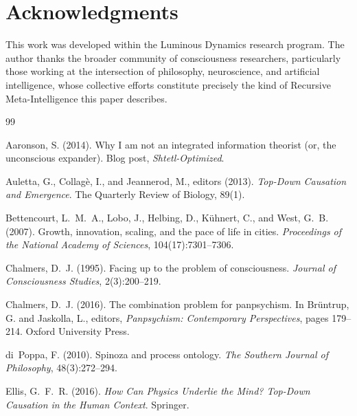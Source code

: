 \documentclass[12pt,a4paper]{article}
\begin{document}
\section*{Acknowledgments}

This work was developed within the Luminous Dynamics research program.  The
author thanks the broader community of consciousness researchers,
particularly those working at the intersection of philosophy, neuroscience,
and artificial intelligence, whose collective efforts constitute precisely
the kind of Recursive Meta-Intelligence this paper describes.




\begin{thebibliography}{99}

Aaronson, S. (2014).
\newblock Why I am not an integrated information theorist (or, the
  unconscious expander).
\newblock Blog post, \emph{Shtetl-Optimized}.

Auletta, G., Collag\`{e}, I., and Jeannerod, M., editors (2013).
\newblock \emph{Top-Down Causation and Emergence}.
\newblock The Quarterly Review of Biology, 89(1).

Bettencourt, L.~M.~A., Lobo, J., Helbing, D., K\"{u}hnert, C., and
  West, G.~B. (2007).
\newblock Growth, innovation, scaling, and the pace of life in cities.
\newblock \emph{Proceedings of the National Academy of Sciences},
  104(17):7301--7306.

Chalmers, D.~J. (1995).
\newblock Facing up to the problem of consciousness.
\newblock \emph{Journal of Consciousness Studies}, 2(3):200--219.

Chalmers, D.~J. (2016).
\newblock The combination problem for panpsychism.
\newblock In Br\"{u}ntrup, G. and Jaskolla, L., editors, \emph{Panpsychism:
  Contemporary Perspectives}, pages 179--214. Oxford University Press.

di~Poppa, F. (2010).
\newblock Spinoza and process ontology.
\newblock \emph{The Southern Journal of Philosophy}, 48(3):272--294.

Ellis, G.~F.~R. (2016).
\newblock \emph{How Can Physics Underlie the Mind? Top-Down Causation in
  the Human Context}.
\newblock Springer.


\end{thebibliography}
\end{document}
